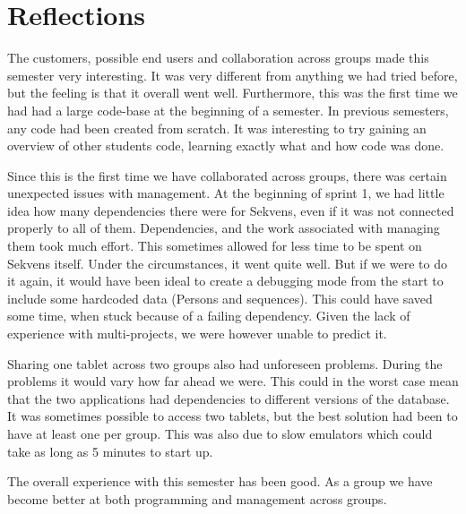 \section{Reflections}\label{sec:reflections}

The customers, possible end users and collaboration across groups made this semester very interesting. It was very different from anything we had tried before, but the feeling is that it overall went well. Furthermore, this was the first time we had had a large code-base at the beginning of a semester. In previous semesters, any code had been created from scratch. It was interesting to try gaining an overview of other students code, learning exactly what and how code was done.

Since this is the first time we have collaborated across groups, there was certain unexpected issues with management. At the beginning of sprint 1, we had little idea how many dependencies there were for Sekvens, even if it was not connected properly to all of them. Dependencies, and the work associated with managing them took much effort. This sometimes allowed for less time to be spent on Sekvens itself. Under the circumstances, it went quite well. But if we were to do it again, it would have been ideal to create a debugging mode from the start to include some hardcoded data (Persons and sequences). This could have saved some time, when stuck because of a failing dependency. Given the lack of experience with multi-projects, we were however unable to predict it.

Sharing one tablet across two groups also had unforeseen problems. During the problems it would vary how far ahead we were. This could in the worst case mean that the two applications had dependencies to different versions of the database. It was sometimes possible to access two tablets, but the best solution had been to have at least one per group. This was also due to slow emulators which could take as long as 5 minutes to start up.

The overall experience with this semester has been good. As a group we have become better at both programming and management across groups.